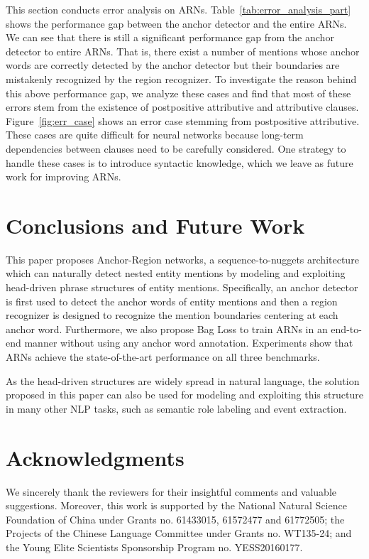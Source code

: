 \documentclass[11pt,a4paper]{article}
\begin{document}
This section conducts error analysis on ARNs. Table~\ref{tab:error_analysis_part} shows the performance gap between the anchor detector and the entire ARNs. We can see that there is still a significant performance gap from the anchor detector to entire ARNs. That is, there exist a number of mentions whose anchor words are correctly detected by the anchor detector but their boundaries are mistakenly recognized by the region recognizer. To investigate the reason behind this above performance gap, we analyze these cases and find that most of these errors stem from the existence of postpositive attributive and attributive clauses. Figure~\ref{fig:err_case} shows an error case stemming from postpositive attributive. These cases are quite difficult for neural networks because long-term dependencies between clauses need to be carefully considered. One strategy to handle these cases is to introduce syntactic knowledge, which we leave as future work for improving ARNs.




\section{Conclusions and Future Work}
This paper proposes Anchor-Region networks, a sequence-to-nuggets architecture which can naturally detect nested entity mentions by modeling and exploiting head-driven phrase structures of entity mentions. Specifically, an anchor detector is first used to detect the anchor words of entity mentions and then a region recognizer is designed to recognize the mention boundaries centering at each anchor word. Furthermore, we also propose Bag Loss to train ARNs in an end-to-end manner without using any anchor word annotation. Experiments show that ARNs achieve the state-of-the-art performance on all three benchmarks.

As the head-driven structures are widely spread in natural language, the solution proposed in this paper can also be used for modeling and exploiting this structure in many other NLP tasks, such as semantic role labeling and event extraction.

\section*{Acknowledgments}

We sincerely thank the reviewers for their insightful comments and valuable suggestions. Moreover, this work is supported by the National Natural Science Foundation of China under Grants no. 61433015, 61572477 and 61772505; the Projects of the Chinese Language Committee under Grants no. WT135-24; and the Young Elite Scientists Sponsorship Program no. YESS20160177.



\end{document}
